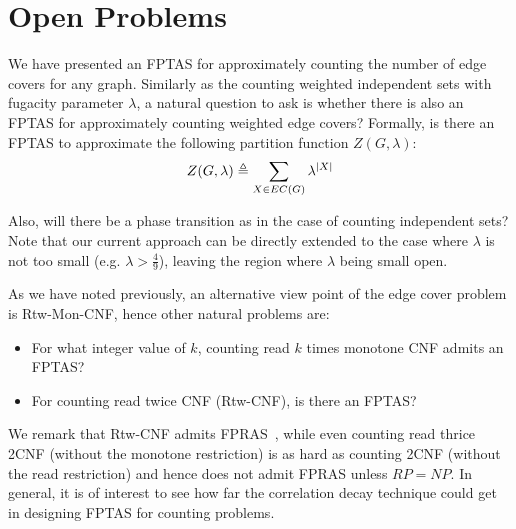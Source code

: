 \section{Open Problems}
We have presented an FPTAS for approximately counting the number of edge covers for any graph. Similarly as the counting weighted independent sets with fugacity parameter $\lambda$, a natural question to ask is whether there is also an FPTAS for approximately counting weighted edge covers? Formally, is there an FPTAS to approximate the following partition function $Z(G,\lambda)$:
\[Z(G, \lambda) \triangleq \sum_{X \in EC(G)} \lambda^{\left\vert X\right\vert}\]

Also, will there be a phase transition as in the case of counting independent sets? Note that our current approach can be directly extended to the case where $\lambda$ is not too small (e.g. $\lambda > \frac{4}{9}$), leaving the region where $\lambda$ being small open.

As we have noted previously, an alternative view point of the edge cover problem is Rtw-Mon-CNF, hence other natural problems are:
\begin{itemize}
	\item For what integer value of $k$, counting read $k$ times monotone CNF admits an FPTAS?
	\item For counting read twice CNF (Rtw-CNF), is there an FPTAS?
\end{itemize}
We remark that Rtw-CNF admits FPRAS~\cite{TwiceSAT}, while even counting read thrice 2CNF (without the monotone restriction) is as hard as counting 2CNF (without the read restriction) and hence does not admit FPRAS unless $RP=NP$.
In general, it is of interest to see how far the correlation decay technique could get in designing FPTAS for counting problems.
